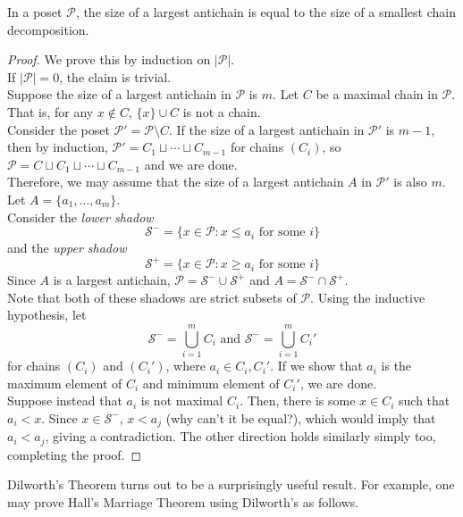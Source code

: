 			\begin{ftheo}
				In a poset $\mathcal{P}$, the size of a largest antichain is equal to the size of a smallest chain decomposition. 
			\end{ftheo}
			\begin{proof}
				We prove this by induction on $|\mathcal{P}|$.\\
				If $|\mathcal{P}| = 0$, the claim is trivial.\\
				Suppose the size of a largest antichain in $\mathcal{P}$ is $m$. Let $C$ be a maximal chain in $\mathcal{P}$. That is, for any $x\not\in C$, $\{x\} \cup C$ is not a chain. \\
				Consider the poset $\mathcal{P}' = \mathcal{P} \setminus C$. If the size of a largest antichain in $\mathcal{P}'$ is $m-1$, then by induction, $\mathcal{P}' = C_1 \sqcup \cdots \sqcup C_{m-1}$ for chains $(C_i)$, so $\mathcal{P} = C \sqcup C_1 \sqcup \cdots \sqcup C_{m-1}$ and we are done. \\
				Therefore, we may assume that the size of a largest antichain $A$ in $\mathcal{P}'$ is also $m$. Let $A = \{a_1,\ldots,a_m\}$. \\
				Consider the \emph{lower shadow}
				\[ \mathcal{S}^- = \{ x \in \mathcal{P} : x \le a_i \text{ for some $i$}\} \]
				and the \emph{upper shadow}
				\[ \mathcal{S}^+ = \{ x \in \mathcal{P} : x \ge a_i \text{ for some $i$}\} \]
				Since $A$ is a largest antichain, $\mathcal{P} = \mathcal{S}^- \cup \mathcal{S}^+$ and $A = \mathcal{S}^- \cap \mathcal{S}^+$.\\
				Note that both of these shadows are strict subsets of $\mathcal{P}$. Using the inductive hypothesis, let
				\[ \mathcal{S}^- = \bigcup_{i=1}^m C_i \text{ and } \mathcal{S}^- = \bigcup_{i=1}^m C_i' \]
				for chains $(C_i)$ and $(C_i')$, where $a_i \in C_i, C_i'$. If we show that $a_i$ is the maximum element of $C_i$ and minimum element of $C_i'$, we are done. \\
				Suppose instead that $a_i$ is not maximal $C_i$. Then, there is some $x \in C_i$ such that $a_i < x$. Since $x \in \mathcal{S}^-$, $x < a_j$ (why can't it be equal?), which would imply that $a_i < a_j$, giving a contradiction. The other direction holds similarly simply too, completing the proof.
			\end{proof}

			Dilworth's Theorem turns out to be a surprisingly useful result. For example, one may prove Hall's Marriage Theorem using Dilworth's as follows.

